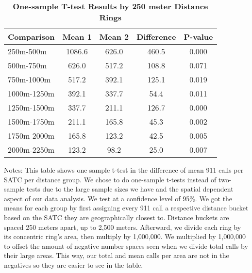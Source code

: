 \begin{table}[htbp]
\centering
\begin{tabular}{l|c c c c}
\hline
Comparison & Mean 1 & Mean 2 & Difference & P-value \\
\hline
250m-500m & 1086.6 & 626.0 & 460.5 & 0.000 \\
500m-750m & 626.0 & 517.2 & 108.8 & 0.071 \\
750m-1000m & 517.2 & 392.1 & 125.1 & 0.019 \\
1000m-1250m & 392.1 & 337.7 & 54.4 & 0.011 \\
1250m-1500m & 337.7 & 211.1 & 126.7 & 0.000 \\
1500m-1750m & 211.1 & 165.8 & 45.3 & 0.002 \\
1750m-2000m & 165.8 & 123.2 & 42.5 & 0.005 \\
2000m-2250m & 123.2 & 98.2 & 25.0 & 0.007 \\
\hline
\end{tabular}
\caption{\textbf{One-sample T-test Results by 250 meter Distance Rings}}
\label{tab:ttests_250}  
\centering\small{Notes: This table shows one sample t-test in the difference of mean 911 calls per SATC per distance group. We chose to do one-sample t-tests instead of two-sample tests due to the large sample sizes we have and the spatial dependent aspect of our data analysis. We test at a confidence level of 95\%. We got the means for each group by first assigning every 911 call a respective distance bucket based on the SATC they are geographically closest to. Distance buckets are spaced 250 meters apart, up to 2,500 meters. Afterward, we divide each ring by its concentric ring's area, then multiply by 1,000,000. We multiplied by 1,000,000 to offset the amount of negative number spaces seen when we divide total calls by their large areas. This way, our total and mean calls per area are not in the negatives so they are easier to see in the table.}
\end{table}
